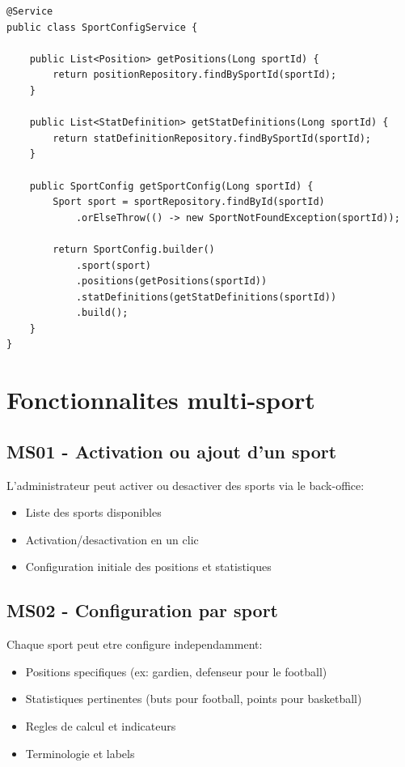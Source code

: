 \begin{lstlisting}[style=codeblock]
@Service
public class SportConfigService {

    public List<Position> getPositions(Long sportId) {
        return positionRepository.findBySportId(sportId);
    }

    public List<StatDefinition> getStatDefinitions(Long sportId) {
        return statDefinitionRepository.findBySportId(sportId);
    }

    public SportConfig getSportConfig(Long sportId) {
        Sport sport = sportRepository.findById(sportId)
            .orElseThrow(() -> new SportNotFoundException(sportId));

        return SportConfig.builder()
            .sport(sport)
            .positions(getPositions(sportId))
            .statDefinitions(getStatDefinitions(sportId))
            .build();
    }
}
\end{lstlisting}

\section{Fonctionnalites multi-sport}

\subsection*{MS01 - Activation ou ajout d'un sport}

L'administrateur peut activer ou desactiver des sports via le back-office:

\begin{itemize}[leftmargin=*]
  \item Liste des sports disponibles
  \item Activation/desactivation en un clic
  \item Configuration initiale des positions et statistiques
\end{itemize}

\subsection*{MS02 - Configuration par sport}

Chaque sport peut etre configure independamment:

\begin{itemize}[leftmargin=*]
  \item Positions specifiques (ex: gardien, defenseur pour le football)
  \item Statistiques pertinentes (buts pour football, points pour basketball)
  \item Regles de calcul et indicateurs
  \item Terminologie et labels
\end{itemize}

